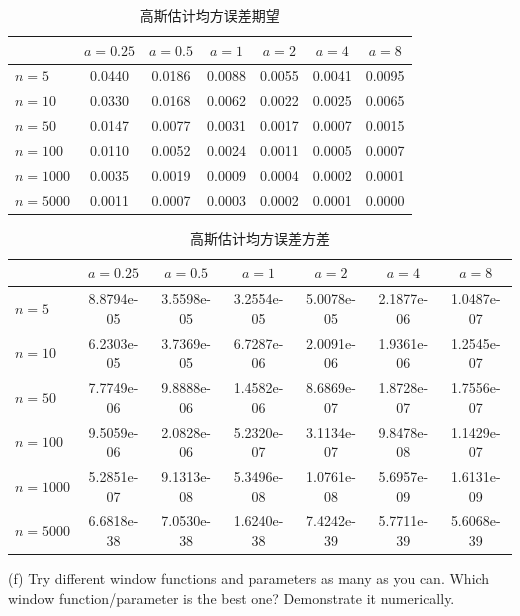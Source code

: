 \documentclass[openany]{ctexbook}
\theoremstyle{kaiti}
\theoremstyle{normal}
\begin{document}
\begin{table}[htbp]
  \centering
  \begin{tabular}{l|cccccc}
  \hline
           & $a=0.25$ & $a=0.5$ & $a=1$  & $a=2$  & $a=4$  & $a=8$  \\ \hline
  $n=5$    & 0.0440   & 0.0186  & 0.0088 & 0.0055 & 0.0041 & 0.0095 \\
  $n=10$   & 0.0330   & 0.0168  & 0.0062 & 0.0022 & 0.0025 & 0.0065 \\
  $n=50$   & 0.0147   & 0.0077  & 0.0031 & 0.0017 & 0.0007 & 0.0015 \\
  $n=100$  & 0.0110   & 0.0052  & 0.0024 & 0.0011 & 0.0005 & 0.0007 \\
  $n=1000$ & 0.0035   & 0.0019  & 0.0009 & 0.0004 & 0.0002 & 0.0001 \\
  $n=5000$ & 0.0011   & 0.0007  & 0.0003 & 0.0002 & 0.0001 & 0.0000 \\ \hline
  \end{tabular}
  \caption{高斯估计均方误差期望}
  \label{tab:gauMeanMSE}
\end{table}

\begin{table}[htbp]
  \centering
  \begin{tabular}{l|cccccc}
  \hline
           & $a=0.25$   & $a=0.5$    & $a=1$      & $a=2$      & $a=4$      & $a=8$      \\ \hline
  $n=5$    & 8.8794e-05 & 3.5598e-05 & 3.2554e-05 & 5.0078e-05 & 2.1877e-06 & 1.0487e-07 \\
  $n=10$   & 6.2303e-05 & 3.7369e-05 & 6.7287e-06 & 2.0091e-06 & 1.9361e-06 & 1.2545e-07 \\
  $n=50$   & 7.7749e-06 & 9.8888e-06 & 1.4582e-06 & 8.6869e-07 & 1.8728e-07 & 1.7556e-07 \\
  $n=100$  & 9.5059e-06 & 2.0828e-06 & 5.2320e-07 & 3.1134e-07 & 9.8478e-08 & 1.1429e-07 \\
  $n=1000$ & 5.2851e-07 & 9.1313e-08 & 5.3496e-08 & 1.0761e-08 & 5.6957e-09 & 1.6131e-09 \\
  $n=5000$ & 6.6818e-38 & 7.0530e-38 & 1.6240e-38 & 7.4242e-39 & 5.7711e-39 & 5.6068e-39 \\ \hline
  \end{tabular}
  \caption{高斯估计均方误差方差}
  \label{tab:gauVarMSE}
\end{table}

(f) Try different window functions and parameters as many as you can. Which window function/parameter is the best one? Demonstrate it numerically.
\end{document}
